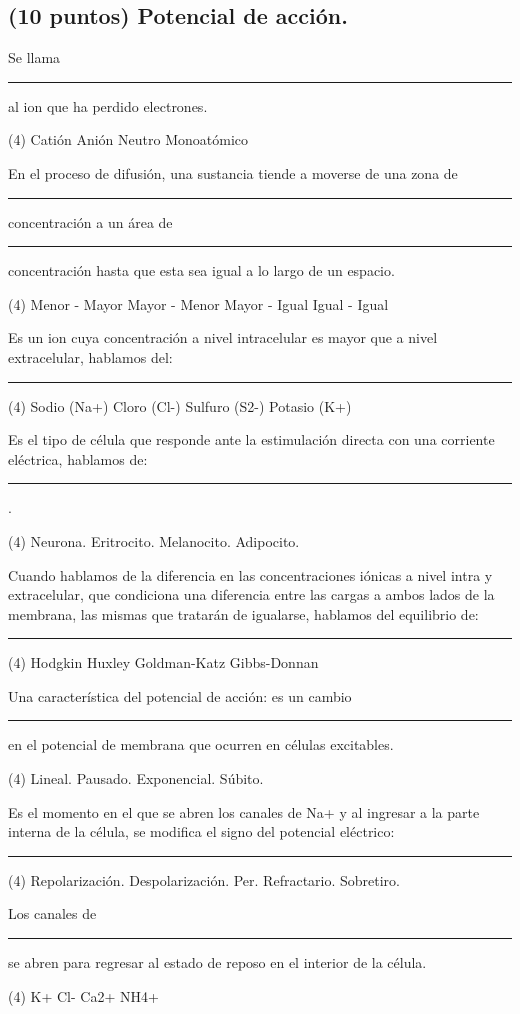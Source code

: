 \documentclass[12pt, letter]{exam}
\begin{document}
\begin{questions}
    \section{(10 puntos) Potencial de acción.}

    \question Se llama \rule{2cm}{0.1mm} al ion que ha perdido electrones.
    \begin{tasks}(4)
        \task Catión
        \task Anión
        \task Neutro
        \task Monoatómico        
    \end{tasks}
    \question En el proceso de difusión, una sustancia tiende a moverse de una zona de \rule{2cm}{0.1mm} concentración a un área de \rule{2cm}{0.1mm} concentración hasta que esta sea igual a lo largo de un espacio.
    \begin{tasks}(4)
        \task Menor - Mayor
        \task Mayor - Menor
        \task Mayor - Igual
        \task Igual - Igual
    \end{tasks}
    \question Es un ion cuya concentración a nivel intracelular es mayor que a nivel extracelular, hablamos del: \rule{2cm}{0.1mm}
    \begin{tasks}(4)
        \task Sodio (Na+)
        \task Cloro (Cl-)
        \task Sulfuro (S2-)
        \task Potasio (K+)
    \end{tasks}
    \question Es el tipo de célula que responde ante la estimulación directa con una corriente eléctrica, hablamos de: \rule{2cm}{0.1mm}.
    \begin{tasks}(4)
        \task Neurona.
        \task Eritrocito.
        \task Melanocito.
        \task Adipocito.
    \end{tasks}
    \question Cuando hablamos de la diferencia en las concentraciones iónicas a nivel intra y extracelular, que condiciona una diferencia entre las cargas a ambos lados de la membrana, las mismas que tratarán de igualarse, hablamos del equilibrio de: \rule{2cm}{0.1mm}
    \begin{tasks}(4)
        \task Hodgkin
        \task Huxley
        \task Goldman-Katz
        \task Gibbs-Donnan
    \end{tasks}
    \question Una característica del potencial de acción: es un cambio \rule{2cm}{0.1mm} en el potencial de membrana que ocurren en células excitables.
    \begin{tasks}(4)
        \task Lineal.        
        \task Pausado.        
        \task Exponencial.        
        \task Súbito.        
    \end{tasks}
    \question Es el momento en el que se abren los canales de Na+ y al ingresar a la parte interna de la célula, se modifica el signo del potencial eléctrico: \rule{2cm}{0.1mm}
    \begin{tasks}(4)
        \task Repolarización.
        \task Despolarización.
        \task Per. Refractario.
        \task Sobretiro.
    \end{tasks}
    \question Los canales de \rule{2cm}{0.1mm} se abren para regresar al estado de reposo en el interior de la célula.
    \begin{tasks}(4)
        \task K+
        \task Cl-
        \task Ca2+
        \task NH4+
    \end{tasks}


\end{questions}
\end{document}
